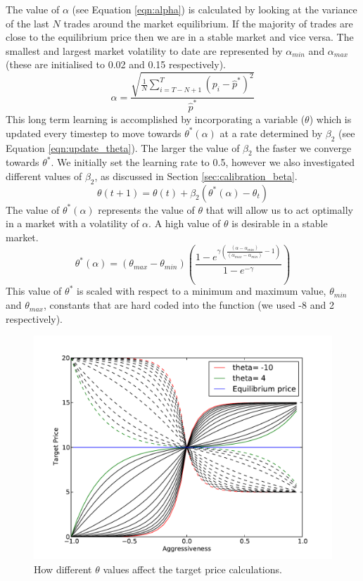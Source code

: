 \documentclass[preprint]{acm_proc_article-sp} %
\begin{document}
The  value of $\alpha$ (see Equation \ref{eqn:alpha}) is calculated
by looking at the variance of the last $N$ trades around the market equilibrium.
If the majority of trades are close to the equilibrium price then we are in
a stable market and vice versa. The smallest and largest market volatility to date are represented 
by $\alpha_{min}$ and $\alpha_{max}$ (these are initialised to 0.02 and 0.15 respectively).
\begin{equation}
  \alpha = \frac{\sqrt{\frac 1 N \sum^T_{i=T-N+1}(p_i-\hat p^*)^2}}{\hat p^*}
  \label{eqn:alpha}
\end{equation}
This long term learning is accomplished by incorporating a variable ($\theta$) which is updated every
timestep to move towards $\theta^*(\alpha)$ at a rate determined by $\beta_2$ (see Equation \ref{eqn:update_theta}).
The larger the value of $\beta_2$ the faster we converge towards $\theta^*$. We initially set the 
learning rate to 0.5, however we also investigated different values of $\beta_2$, as discussed in 
Section \ref{sec:calibration_beta}.
\begin{equation}
  \theta(t+1)=\theta(t)+\beta_2(\theta^*(\alpha)-\theta_t)
  \label{eqn:update_theta}
\end{equation}
The value of $\theta^*(\alpha)$ represents the value of $\theta$ that will allow us to act optimally in a
market with a volatility of $\alpha$. A high value of $\theta$ is desirable in a stable market.
\begin{equation}
  \theta^*(\alpha) = (\theta_{max}-\theta_{min})
  \left(\frac{1-e^{\gamma\left(\frac{(\alpha-\alpha_{min})}{(\alpha_{max}
  -\alpha_{min})}-1\right)}}{1-e^{-\gamma}}\right)
  \label{thetastar}
\end{equation}
This value of $\theta^*$ is scaled with
respect to a minimum and maximum value, $\theta_{min}$ and $\theta_{max}$, constants that are hard coded into the
function (we used -8 and 2 respectively).

\begin{figure}[H]
  \centering
  \includegraphics[width=\columnwidth]{graphs_and_stats/graph_thetas.pdf}
  \caption{How different $\theta$ values affect the target price calculations.}
  \label{fig:theta}
\end{figure}
\end{document}
